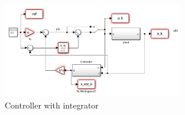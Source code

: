 \begin{figure}[H]
    \centering
    \includegraphics[width=0.7\textwidth]{Figs/Simulink Models/controller_with_integrator.png}
    \caption{Controller with integrator}
    \label{fig:controler_with_integrator}
\end{figure}

